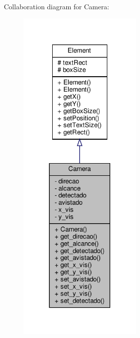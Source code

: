 Collaboration diagram for Camera\+:
\nopagebreak
\begin{figure}[H]
\begin{center}
\leavevmode
\includegraphics[width=173pt]{classCamera__coll__graph}
\end{center}
\end{figure}
